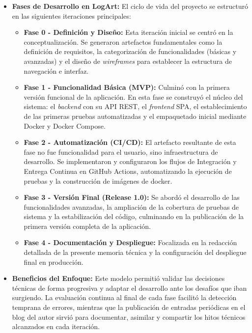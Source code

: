\begin{itemize}
    \item \textbf{Fases de Desarrollo en LogArt:} El ciclo de vida del proyecto se estructuró en las siguientes iteraciones principales:
    \begin{itemize}
        \item \textbf{Fase 0 - Definición y Diseño:} Esta iteración inicial se centró en la conceptualización. Se generaron artefactos fundamentales como la definición de requisitos, la categorización de funcionalidades (básicas y avanzadas) y el diseño de \textit{wireframes} para establecer la estructura de navegación e interfaz.
        \item \textbf{Fase 1 - Funcionalidad Básica (MVP):} Culminó con la primera versión funcional de la aplicación. En esta fase se construyó el núcleo del sistema: el \textit{backend} con su API REST, el \textit{frontend} SPA, el establecimiento de las primeras pruebas automatizadas y el empaquetado inicial mediante Docker y Docker Compose.
        \item \textbf{Fase 2 - Automatización (CI/CD):} El artefacto resultante de esta fase no fue funcionalidad para el usuario, sino infraestructura de desarrollo. Se implementaron y configuraron los flujos de Integración y Entrega Continua en GitHub Actions, automatizando la ejecución de pruebas y la construcción de imágenes de docker.
        \item \textbf{Fase 3 - Versión Final (Release 1.0):} Se abordó el desarrollo de las funcionalidades avanzadas, la ampliación de la cobertura de pruebas de sistema y la estabilización del código, culminando en la publicación de la primera versión completa de la aplicación.
        \item \textbf{Fase 4 - Documentación y Despliegue:} Focalizada en la redacción detallada de la presente memoria técnica y la configuración del despliegue final en producción.
    \end{itemize}

    \item \textbf{Beneficios del Enfoque:} Este modelo permitió validar las decisiones técnicas de forma progresiva y adaptar el desarrollo ante los desafíos que iban surgiendo. La evaluación continua al final de cada fase facilitó la detección temprana de errores, mientras que la publicación de entradas periódicas en el blog del autor\cite{MorenoMediumBlogLogArt} sirvió para documentar, asimilar y compartir los hitos técnicos alcanzados en cada iteración.
\end{itemize}
